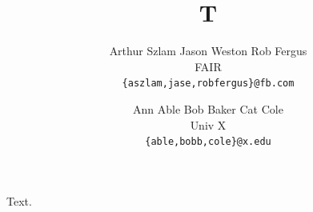 \documentclass{article}
\title{T}
\author{Arthur Szlam \:\:\:\:\:\: Jason Weston \:\:\:\:\:\: Rob Fergus \\ FAIR \\
\texttt{\{aszlam,jase,robfergus\}@fb.com}
\and Ann Able \quad Bob Baker \quad Cat Cole \\ Univ X \\ \texttt{\{able,bobb,cole\}@x.edu}}
\begin{document}
\maketitle
Text.
\end{document}
